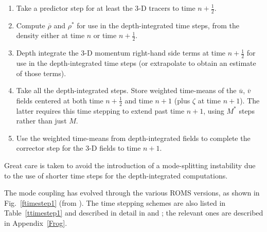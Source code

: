 \begin{enumerate}
  \item Take a predictor step for at least the 3-D tracers to time
  $n+\frac{1}{2}$.
  \item Compute $\overline{\rho}$ and
$\rho^*$ for use in the depth-integrated time steps, from the density
either at time $n$ or time $n+\frac{1}{2}$.
  \item Depth integrate the 3-D momentum right-hand side terms at
time $n+\frac{1}{2}$ for use in the depth-integrated time steps (or extrapolate
to obtain an estimate of those terms).
  \item Take all the depth-integrated steps. Store weighted
time-means of the $\overline{u}$, $\overline{v}$ fields centered at both
time $n+\frac{1}{2}$ and time $n+1$ (plus $\zeta$ at time $n+1$). The latter
requires this time stepping to extend past time $n+1$, using $M^*$ steps
rather than just $M$.
  \item Use the weighted time-means from depth-integrated fields to
complete the corrector step for the 3-D fields to time $n+1$.
\end{enumerate}
Great care is taken to avoid the introduction of a mode-splitting
instability due to the use of shorter time steps for the depth-integrated
computations.

The mode coupling has evolved through the various ROMS versions,
as shown in Fig.~\ref{ftimestep1} (from \cite{SS2008a}). The time stepping
schemes are also listed in Table~\ref{ttimestep1} and described in
detail in \cite{SS2005} and \cite{SS2008b}; the relevant ones
are described in Appendix~\ref{Frog}.

